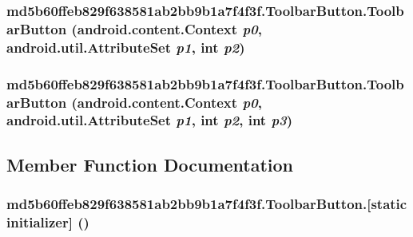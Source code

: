 \hypertarget{classmd5b60ffeb829f638581ab2bb9b1a7f4f3f_1_1_toolbar_button_d5e43fe6b0e4f51252d4391663d59e82}{
\subsubsection[{ToolbarButton}]{\setlength{\rightskip}{0pt plus 5cm}md5b60ffeb829f638581ab2bb9b1a7f4f3f.ToolbarButton.ToolbarButton (android.content.Context {\em p0}, \/  android.util.AttributeSet {\em p1}, \/  int {\em p2})}}
\label{classmd5b60ffeb829f638581ab2bb9b1a7f4f3f_1_1_toolbar_button_d5e43fe6b0e4f51252d4391663d59e82}


\hypertarget{classmd5b60ffeb829f638581ab2bb9b1a7f4f3f_1_1_toolbar_button_aae2da423d7cf4bca5554637f07037c8}{
\subsubsection[{ToolbarButton}]{\setlength{\rightskip}{0pt plus 5cm}md5b60ffeb829f638581ab2bb9b1a7f4f3f.ToolbarButton.ToolbarButton (android.content.Context {\em p0}, \/  android.util.AttributeSet {\em p1}, \/  int {\em p2}, \/  int {\em p3})}}
\label{classmd5b60ffeb829f638581ab2bb9b1a7f4f3f_1_1_toolbar_button_aae2da423d7cf4bca5554637f07037c8}




\subsection{Member Function Documentation}
\hypertarget{classmd5b60ffeb829f638581ab2bb9b1a7f4f3f_1_1_toolbar_button_7aef286ccbe4c97bbaaafc0fd6808076}{
\subsubsection[{[static initializer]}]{\setlength{\rightskip}{0pt plus 5cm}md5b60ffeb829f638581ab2bb9b1a7f4f3f.ToolbarButton.\mbox{[}static initializer\mbox{]} ()}}
\label{classmd5b60ffeb829f638581ab2bb9b1a7f4f3f_1_1_toolbar_button_7aef286ccbe4c97bbaaafc0fd6808076}


